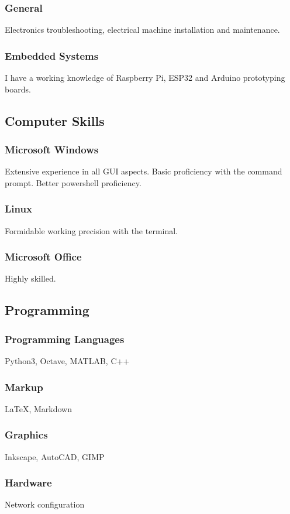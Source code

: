 \documentclass[a4paper]{article}
\begin{document}
\subsubsection{General}
Electronics troubleshooting, electrical machine installation and maintenance.
\subsubsection{Embedded Systems}
I have a working knowledge of Raspberry Pi, ESP32 and Arduino prototyping boards.

\subsection{Computer Skills}
\subsubsection{Microsoft Windows}
Extensive experience in all GUI aspects. Basic proficiency with the command prompt. Better powershell proficiency.
\subsubsection{Linux}
Formidable working precision with the terminal.
\subsubsection{Microsoft Office}
Highly skilled.

\subsection{Programming}
\subsubsection{Programming Languages}
Python3, Octave, MATLAB, C++
\subsubsection{Markup}
\LaTeX, Markdown
\subsubsection{Graphics}
Inkscape, AutoCAD, GIMP
\subsubsection{Hardware}
Network configuration
\end{document}
